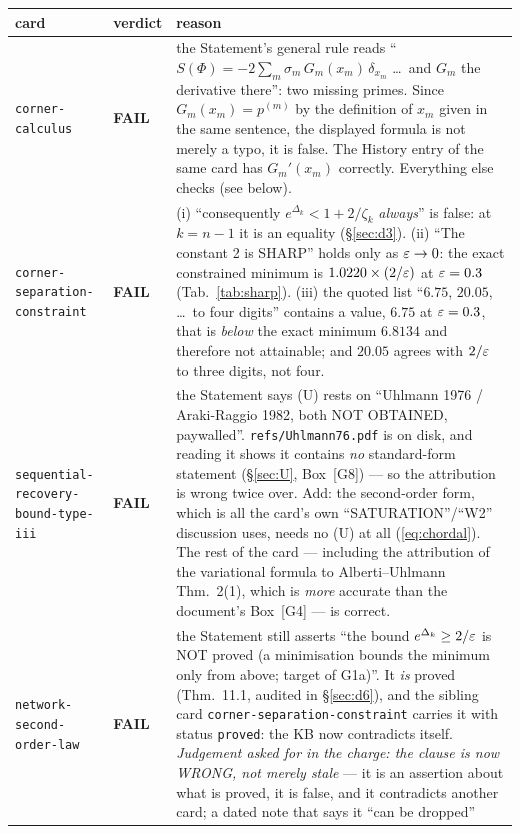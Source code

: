\documentclass[11pt]{article}
\theoremstyle{definition}\newtheorem{example}[theorem]{Example}
\begin{document}
\begin{center}\small
\begin{tabular}{@{}llp{8.6cm}@{}}
\toprule
card & verdict & reason\\
\midrule
\texttt{corner-calculus} & \textbf{FAIL} & the Statement's general rule reads
 ``$S(\Phi)=-2\sum_m\sigma_m\,G_m(x_m)\,\delta_{x_m}$ \dots\ and $G_m$ the derivative
 there'': two missing primes.  Since $G_m(x_m)=p^{(m)}$ by the definition of $x_m$ given in
 the same sentence, the displayed formula is not merely a typo, it is false.  The History
 entry of the same card has $G_m'(x_m)$ correctly.  Everything else checks (see below).\\
\texttt{corner-separation-constraint} & \textbf{FAIL} & (i) ``consequently
 $e^{\Delta_k}<1+2/\zeta_k$ \emph{always}'' is false: at $k=n-1$ it is an equality
 (\S\ref{sec:d3}).  (ii) ``The constant 2 is SHARP'' holds only as $\varepsilon\to0$: the exact
 constrained minimum is $1.0220\times(2/\varepsilon)$ at $\varepsilon=0.3$ (Tab.~\ref{tab:sharp}).
 (iii) the quoted list ``$6.75$, $20.05$, \dots\ to four digits'' contains a value,
 $6.75$ at $\varepsilon=0.3$, that is \emph{below} the exact minimum $6.8134$ and therefore not
 attainable; and $20.05$ agrees with $2/\varepsilon$ to three digits, not four.\\
\texttt{sequential-recovery-bound-type-iii} & \textbf{FAIL} & the Statement says (U) rests
 on ``Uhlmann 1976 / Araki-Raggio 1982, both NOT OBTAINED, paywalled''.
 \texttt{refs/Uhlmann76.pdf} is on disk, and reading it shows it contains \emph{no}
 standard-form statement (\S\ref{sec:U}, Box~[G8]) --- so the attribution is wrong twice
 over.  Add: the second-order form, which is all the card's own ``SATURATION''/``W2''
 discussion uses, needs no (U) at all (\eqref{eq:chordal}).  The rest of the card ---
 including the attribution of the variational formula to Alberti--Uhlmann Thm.~2(1), which
 is \emph{more} accurate than the document's Box~[G4] --- is correct.\\
\texttt{network-second-order-law} & \textbf{FAIL} & the Statement still asserts ``the bound
 $e^{\Delta_k}\ge2/\varepsilon$ is NOT proved (a minimisation bounds the minimum only from above;
 target of G1a)''.  It \emph{is} proved (Thm.~11.1, audited in \S\ref{sec:d6}), and the
 sibling card \texttt{corner-separation-constraint} carries it with status
 \texttt{proved}: the KB now contradicts itself.  \emph{Judgement asked for in the charge:
 the clause is now WRONG, not merely stale} --- it is an assertion about what is proved,
 it is false, and it contradicts another card; a dated note that says it ``can be dropped''

\end{tabular}
\end{center}
\end{document}
